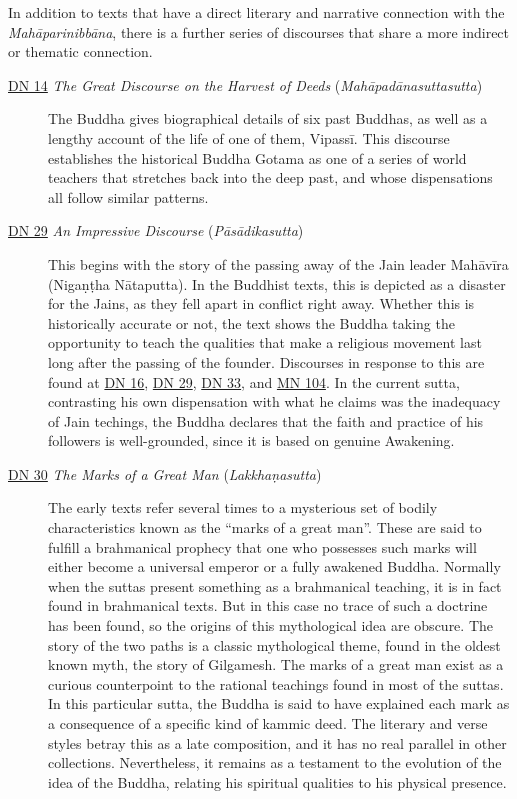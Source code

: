 \documentclass[12pt,openany]{book}%
\begin{document}
In addition to texts that have a direct literary and narrative connection with the \textit{\textsanskrit{Mahāparinibbāna}}, there is a further series of discourses that share a more indirect or thematic connection.

\begin{description}%
\item[\href{https://suttacentral.net/dn14}{DN 14} \textit{The Great Discourse on the Harvest of Deeds} (\textit{\textsanskrit{Mahāpadānasuttasutta}})] The Buddha gives biographical details of six past Buddhas, as well as a lengthy account of the life of one of them, \textsanskrit{Vipassī}. This discourse establishes the historical Buddha Gotama as one of a series of world teachers that stretches back into the deep past, and whose dispensations all follow similar patterns.%
\item[\href{https://suttacentral.net/dn29}{DN 29} \textit{An Impressive Discourse} (\textit{\textsanskrit{Pāsādikasutta}})] This begins with the story of the passing away of the Jain leader \textsanskrit{Mahāvīra} (\textsanskrit{Nigaṇṭha} \textsanskrit{Nātaputta}). In the Buddhist texts, this is depicted as a disaster for the Jains, as they fell apart in conflict right away. Whether this is historically accurate or not, the text shows the Buddha taking the opportunity to teach the qualities that make a religious movement last long after the passing of the founder. Discourses in response to this are found at \href{https://suttacentral.net/dn16}{DN 16}, \href{https://suttacentral.net/dn29}{DN 29}, \href{https://suttacentral.net/dn33}{DN 33}, and \href{https://suttacentral.net/mn104}{MN 104}. In the current sutta, contrasting his own dispensation with what he claims was the inadequacy of Jain techings, the Buddha declares that the faith and practice of his followers is well-grounded, since it is based on genuine Awakening.%
\item[\href{https://suttacentral.net/dn30}{DN 30} \textit{The Marks of a Great Man} (\textit{\textsanskrit{Lakkhaṇasutta}})] The early texts refer several times to a mysterious set of bodily characteristics known as the “marks of a great man”. These are said to fulfill a brahmanical prophecy that one who possesses such marks will either become a universal emperor or a fully awakened Buddha. Normally when the suttas present something as a brahmanical teaching, it is in fact found in brahmanical texts. But in this case no trace of such a doctrine has been found, so the origins of this mythological idea are obscure. The story of the two paths is a classic mythological theme, found in the oldest known myth, the story of Gilgamesh. The marks of a great man exist as a curious counterpoint to the rational teachings found in most of the suttas. In this particular sutta, the Buddha is said to have explained each mark as a consequence of a specific kind of kammic deed. The literary and verse styles betray this as a late composition, and it has no real parallel in other collections. Nevertheless, it remains as a testament to the evolution of the idea of the Buddha, relating his spiritual qualities to his physical presence.%

\end{description}
\end{document}
